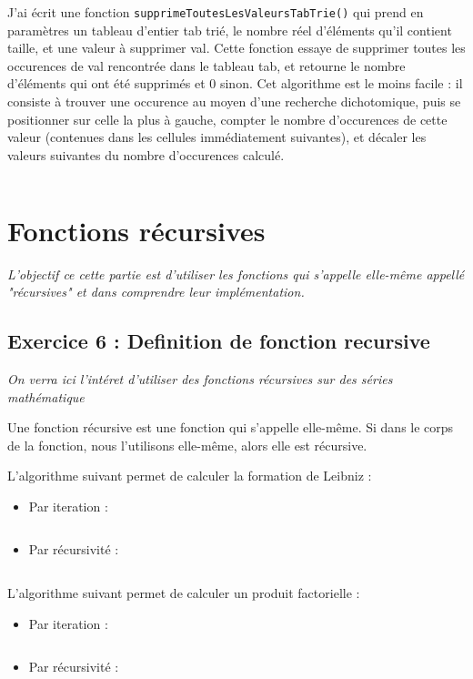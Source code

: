 J'ai écrit une fonction \texttt{supprimeToutesLesValeursTabTrie()} qui prend en paramètres un tableau d’entier tab trié, le nombre réel d’éléments qu’il contient taille, et une valeur à supprimer val. Cette fonction essaye de supprimer toutes les occurences de val rencontrée dans le tableau tab, et retourne le nombre d’éléments qui ont été supprimés et 0 sinon. Cet algorithme est le moins facile : il consiste à trouver une occurence au moyen d’une recherche dichotomique, puis se positionner sur celle la plus à gauche, compter le nombre d’occurences de cette valeur (contenues dans les cellules immédiatement suivantes), et décaler les valeurs suivantes du nombre d’occurences calculé.
\inputminted[linenos,firstline=48, lastline=81]{cpp}{../sources/cpp/TP1-2/modifTableauxTries.c}

\section{Fonctions récursives}
\textit{L’objectif ce cette partie est d’utiliser les fonctions qui s’appelle elle-même appellé "récursives" et dans comprendre leur implémentation.}

\subsection{Exercice 6 : Definition de fonction recursive}
\textit{On verra ici l'intéret d'utiliser des fonctions récursives sur des séries mathématique}

Une fonction récursive est une fonction qui s'appelle elle-même. Si dans le corps de la fonction, nous l'utilisons elle-même, alors elle est récursive.

L'algorithme suivant permet de calculer la formation de Leibniz :

\begin{itemize}
\item Par iteration :
\inputminted[linenos,firstline=7, lastline=14]{cpp}{../sources/cpp/TP1-2/piLeibniz.c}
\item Par récursivité :
\inputminted[linenos,firstline=16, lastline=19]{cpp}{../sources/cpp/TP1-2/piLeibniz.c}
\end{itemize}

L'algorithme suivant permet de calculer un produit factorielle :

\begin{itemize}
\item Par iteration :
\inputminted[linenos,firstline=7, lastline=14]{cpp}{../sources/cpp/TP1-2/factorielle.c}
\item Par récursivité :
\inputminted[linenos,firstline=16, lastline=21]{cpp}{../sources/cpp/TP1-2/factorielle.c}
\end{itemize}

